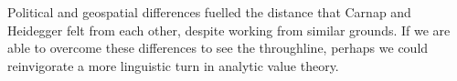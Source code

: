 \documentclass[leqno, 12pt]{turabian-researchpaper}
\begin{document}
	Political and geospatial differences fuelled the distance that Carnap and Heidegger
	felt from each other, despite working from similar grounds. If we are able to overcome
	these differences to see the throughline, perhaps we could reinvigorate a more
	linguistic turn in analytic value theory. %

	\clearpage
	\printbibliography
\end{document}
